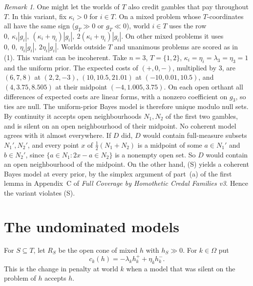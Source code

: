 \documentclass[11pt]{article}
\theoremstyle{remark}\newtheorem{remark}[theorem]{Remark}
\begin{document}
\begin{remark}\label{rem:variant}
One might let the worlds of $T$ also credit gambles that pay throughout
$T$. In this variant, fix $\kappa_i>0$ for $i\in T$. On a mixed problem
whose $T$-coordinates all have the same sign ($g_T\gg0$ or $g_T\ll0$), world
$i\in T$ uses the row $0,\ \kappa_i|g_i|,\ (\kappa_i+\eta_i)|g_i|,\
2(\kappa_i+\eta_i)|g_i|$. On other mixed problems it uses
$0,\ 0,\ \eta_i|g_i|,\ 2\eta_i|g_i|$. Worlds outside $T$ and unanimous
problems are scored as in (1). This variant can be incoherent. Take
$n=3$, $T=\{1,2\}$, $\kappa_i=\eta_i=\lambda_3=\eta_3=1$ and the uniform
prior. The expected costs of $(+,0,-)$, multiplied by $3$, are
$(6,7,8)$ at $(2,2,-3)$, $(10,10.5,21.01)$ at $(-10,0.01,10.5)$, and
$(4,3.75,8.505)$ at their midpoint $(-4,1.005,3.75)$. On each open
orthant all differences of expected costs are linear forms, with a
nonzero coefficient on $g_3$, so ties are null. The uniform-prior Bayes
model is therefore unique modulo null sets. By continuity it accepts open
neighbourhoods $N_1,N_2$ of the first two gambles, and is silent on an
open neighbourhood of their midpoint. No coherent model agrees with it
almost everywhere. If $D$ did, $D$ would contain full-measure subsets
$N_1',N_2'$, and every point $x$ of $\tfrac12(N_1+N_2)$ is a midpoint of
some $a\in N_1'$ and $b\in N_2'$, since $\{a\in N_1:2x-a\in N_2\}$ is a
nonempty open set. So $D$ would contain an open neighbourhood of the
midpoint. On the other hand, (S) yields a coherent Bayes model at every
prior, by the simplex argument of part~(a) of the first lemma in
Appendix~C of \emph{Full Coverage by Homothetic Credal Families v3}. Hence
the variant violates (S).
\end{remark}

\section{The undominated models}

For $S\subseteq T$, let $R_S$ be the open cone of mixed $h$ with $h_S\gg0$.
For $k\in\Omega$ put
\[
 c_k(h)=-\lambda_kh_k^++\eta_kh_k^-.
\]
This is the change in penalty at world $k$ when a model that was silent on
the problem of $h$ accepts $h$.
\end{document}
